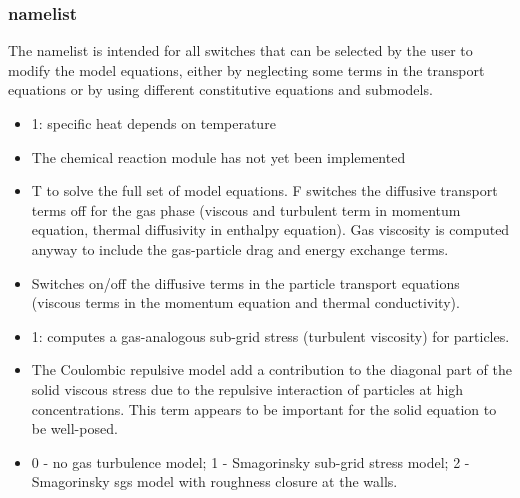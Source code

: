 \subsubsection{ namelist}
The  namelist is intended for all switches that can be selected
by the user to modify the model equations, either by neglecting some terms
in the transport equations or by using different constitutive equations
and submodels.

\begin{itemize}

\item
{}
{1: specific heat depends on temperature}

\item
{}
{The chemical reaction module has not yet been implemented}

\item
{}
{T to solve the full set of model equations. F switches the diffusive
transport terms off for the gas phase (viscous and turbulent term in momentum 
equation, thermal diffusivity in enthalpy equation). 
Gas viscosity is computed anyway to include the gas-particle drag and
energy exchange terms.}

\item
{}
{Switches on/off the diffusive terms in the particle transport equations 
(viscous terms in the momentum equation and thermal conductivity).}

\item
{}
{1: computes a gas-analogous sub-grid stress (turbulent viscosity)
for particles.}

\item
{}
{The Coulombic repulsive model add a contribution to the diagonal part of
the solid viscous stress due to the repulsive interaction of particles 
at high concentrations. This term appears to be important for the solid
equation to be well-posed.}

\item
{}
{0 - no gas turbulence model; 1 - Smagorinsky sub-grid stress model;
2 - Smagorinsky sgs model with roughness closure at the walls.}


\end{itemize}
